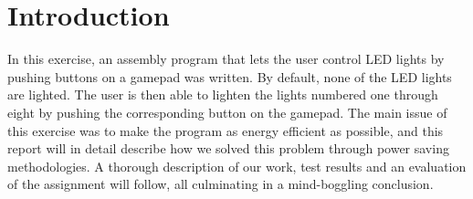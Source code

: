 \section{Introduction}

In this exercise, an assembly program that lets the user control LED lights by pushing buttons on a gamepad was written. By default, none of the LED lights are lighted. The user is then able to lighten the lights numbered one through eight by pushing the corresponding button on the gamepad. The main issue of this exercise was to make the program as energy efficient as possible, and this report will in detail describe how we solved this problem through power saving methodologies. A thorough description of our work, test results and an evaluation of the assignment will follow, all culminating in a mind-boggling conclusion.
